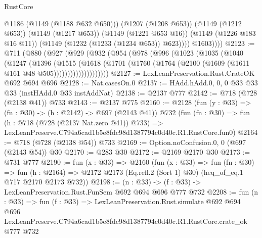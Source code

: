 \begin{lexlean}{RustCore}
\begin{coremodule}
                  @1186
                  (@1149 (@1188 @632 @650)))
                (@1207 (@1208 @653))
                (@1149 (@1212 @653))
                (@1149 (@1217 @653))
                (@1149 (@1221 @653 @16))
                (@1149 (@1226 @183 @16 @11))
                (@1149 (@1232 (@1233 (@1234 @653)) @623))))
            @1603))))
@2123 := @711
    (@880
      (@927
        (@929
          (@932
            (@954
              (@978
                (@996
                  (@1023
                    (@1035
                      (@1040
                        (@1247
                          (@1396
                            (@1515
                              (@1618
                                (@1701
                                  (@1760
                                    (@1764 (@2100 (@1609 (@1611 @161 @48 @505))))))))))))))))))))
@2127 := LexLeanPreservation.Rust.CrateOK @692 @694 @696
@2128 := Nat.casesOn.{0}
@2137 := HAdd.hAdd.{0, 0, 0} @33 @33 @33 (instHAdd.{0} @33 instAddNat)
@2138 := @2137 @777
@2142 := @718 (@728 (@2138 @41)) @733
@2143 := @2137 @775
@2160 := @2128
    (fun (y : @33) => (fn : @30) -> (h : @2142) -> @697 (@2143 @41))
    @732
    (fun (fn : @30) =>
    fun (h : @718 (@728 (@2137 Nat.zero @41)) @733) =>
    LexLeanPreserve.C794a6cad1b5e8fdc98d1387794c0d40c.R1.RustCore.fun0)
@2164 := @718 (@728 (@2138 @54)) @733
@2169 := Option.noConfusion.{0, 0} (@697 (@2143 @54)) @30
@2170 := @283 @30
@2172 := @2169 @2170 @30
@2173 := @731 @777
@2190 := fun (x : @33) =>
  @2160
    (fun (x : @33) =>
    fun (fn : @30) =>
    fun (h : @2164) => @2172 @2173 (Eq.refl.{2} (Sort 1) @30) (heq_of_eq.{1} @717 @2170 @2173 @732))
@2198 := (n : @33) -> (f : @33) -> LexLeanPreservation.Rust.FunSem @692 @694 @696 @777 @732
@2208 := fun (n : @33) =>
  fun (f : @33) =>
  LexLeanPreservation.Rust.simulate
    @692
    @694
    @696
    LexLeanPreserve.C794a6cad1b5e8fdc98d1387794c0d40c.R1.RustCore.crate_ok
    @777
    @732
\end{coremodule}
\end{lexlean}
